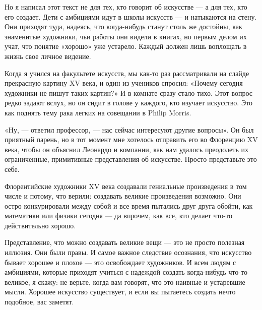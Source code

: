 \documentclass[ebook,12pt,oneside,openany]{memoir}
\begin{document}
Но я написал этот текст не для тех, кто говорит об искусстве — а для
тех, кто его создает. Дети с амбициями идут в школы искусств — и
натыкаются на стену. Они приходят туда, надеясь, что когда-нибудь
станут столь же достойны, как знаменитые художники, чьи работы они
видели в книгах, но первым делом их учат, что понятие «хорошо» уже
устарело. Каждый должен лишь воплощать в жизнь свое личное видение.

Когда я учился на факультете искусств, мы как-то раз рассматривали на
слайде прекрасную картину XV века, и один из учеников спросил: «Почему
сегодня художники не пишут таких картин?» И в комнате сразу стало
тихо. Этот вопрос редко задают вслух, но он сидит в голове у каждого,
кто изучает искусство. Это как поднять тему рака легких на совещании в
Philip Morris.

«Ну, — ответил профессор, — нас сейчас интересуют другие вопросы». Он
был приятный парень, но в тот момент мне хотелось отправить его во
Флоренцию XV века, чтобы он объяснил Леонардо и компании, как нам
удалось преодолеть их ограниченные, примитивные представления об
искусстве. Просто представьте это себе.

Флорентийские художники XV века создавали гениальные произведения в
том числе и потому, что верили: создавать великие произведения
возможно. Они остро конкурировали между собой и все время пытались
друг друга обойти, как математики или физики сегодня — да впрочем, как
все, кто делает что-то действительно хорошо.

Представление, что можно создавать великие вещи — это не просто
полезная иллюзия. Они были правы. И самое важное следствие осознания,
что искусство бывает хорошее и плохое — это освобождает художников. И
всем людям с амбициями, которые приходят учиться с надеждой создать
когда-нибудь что-то великое, я скажу: не верьте, когда вам говорят,
что это наивные и устаревшие мысли. Хорошее искусство существует, и
если вы пытаетесь создать нечто подобное, вас заметят.
\end{document}

